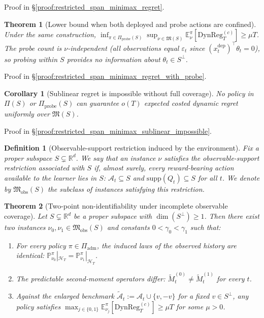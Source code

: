 \documentclass{article}
\newcommand{\R}{\mathbb{R}}
\newcommand{\E}{\mathbb{E}}
\newcommand{\Prob}{\mathbb{P}}
\newcommand{\cA}{\mathcal{A}}
\newcommand{\cH}{\mathcal{H}}
\newcommand{\DynReg}{\mathrm{DynReg}}
\newcommand{\supp}{\mathrm{supp}}
\newtheorem{definition}{Definition}
\newtheorem{theorem}{Theorem}
\newtheorem{corollary}{Corollary}
\begin{document}
Proof in \S\ref{proof:restricted_span_minimax_regret}.

\begin{theorem}[Lower bound when both deployed and probe actions are confined]
\label{thm:restricted_span_minimax_regret_with_probe}
Under the same construction, $\inf_{\pi \in \Pi_{\mathrm{probe}}(S)} \sup_{\nu \in \mathfrak M(S)} \E_\nu^\pi[\DynReg_T^{(c)}] \ge \mu T$.
The probe count is $\nu$-independent (all observations equal $\varepsilon_t$ since $(x_t^{\mathrm{dep}})^\top \theta_t = 0$), so probing within $S$ provides no information about $\theta_t \in S^\perp$.
\end{theorem}

Proof in \S\ref{proof:restricted_span_minimax_regret_with_probe}.

\begin{corollary}[Sublinear regret is impossible without full coverage]
\label{cor:restricted_span_minimax_sublinear_impossible}
No policy in $\Pi(S)$ or $\Pi_{\mathrm{probe}}(S)$ can guarantee $o(T)$ expected costed dynamic regret uniformly over $\mathfrak M(S)$.
\end{corollary}

Proof in \S\ref{proof:restricted_span_minimax_sublinear_impossible}.

\begin{definition}[Observable-support restriction induced by the environment]
\label{def:observable_support_restriction}
Fix a proper subspace $S\subsetneq \R^d$. We say that an instance $\nu$ satisfies the observable-support restriction associated with $S$ if, almost surely, every reward-bearing action available to the learner lies in $S$: $\cA_t \subseteq S$ and $\supp(Q_t)\subseteq S$ for all $t$. We denote by $\mathfrak M_{\mathrm{obs}}(S)$ the subclass of instances satisfying this restriction.
\end{definition}

\begin{theorem}[Two-point non-identifiability under incomplete observable coverage]
\label{thm:two_point_testing_incomplete_coverage}
Let $S\subsetneq \R^d$ be a proper subspace with $\dim(S^\perp)\ge 1$.
Then there exist two instances $\nu_0,\nu_1 \in \mathfrak M_{\mathrm{obs}}(S)$ and constants $0<\gamma_0<\gamma_1$ such that:
\begin{enumerate}[label=(\roman*)]
    \item For every policy $\pi \in \Pi_{\mathrm{adm}}$, the induced laws of the observed history are identical: $\Prob_{\nu_0}^\pi|_{\cH_T} = \Prob_{\nu_1}^\pi|_{\cH_T}$.
    \item The predictable second-moment operators differ: $\widetilde{M}_t^{(0)} \ne \widetilde{M}_t^{(1)}$ for every $t$.
    \item Against the enlarged benchmark $\widetilde{\cA}_t := \cA_t \cup \{v, -v\}$ for a fixed $v \in S^\perp$, any policy satisfies $\max_{j\in\{0,1\}} \E_{\nu_j}^\pi[\DynReg_T^{(c)}] \ge \mu T$ for some $\mu > 0$.
\end{enumerate}
\end{theorem}
\end{document}
